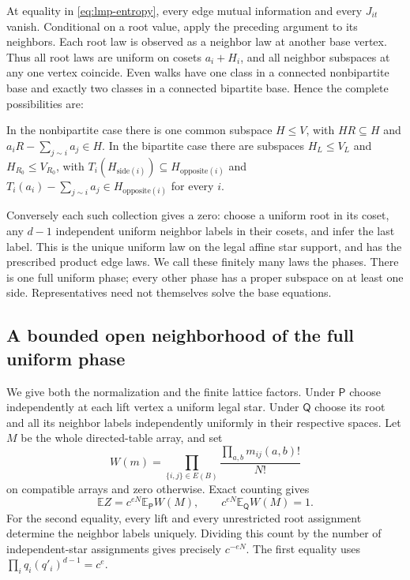 At equality in \eqref{eq:lmp-entropy}, every edge mutual information
and every $J_{it}$ vanish. Conditional on a root value, apply the
preceding argument to its neighbors. Each root law is observed as a
neighbor law at another base vertex. Thus all root laws are uniform
on cosets $a_i+H_i$, and all neighbor subspaces at any one vertex
coincide. Even walks have one class in a connected nonbipartite base
and exactly two classes in a connected bipartite base. Hence the
complete possibilities are:

In the nonbipartite case there is one common subspace $H\le V$, with
$HR\subseteq H$ and $a_iR-\sum_{j\sim i}a_j\in H$.
In the bipartite case there are subspaces $H_L\le V_L$ and
$H_{R_0}\le V_{R_0}$, with
$T_i(H_{\mathrm{side}(i)})\subseteq H_{\mathrm{opposite}(i)}$ and
$T_i(a_i)-\sum_{j\sim i}a_j\in H_{\mathrm{opposite}(i)}$ for every $i$.

Conversely each such collection gives a zero: choose a uniform root
in its coset, any $d-1$ independent uniform neighbor labels in their
cosets, and infer the last label. This is the unique uniform law on
the legal affine star support, and has the prescribed product edge
laws. We call these finitely many laws the phases. There is one full
uniform phase; every other phase has a proper subspace on at least
one side. Representatives need not themselves solve the base equations.

\subsection{A bounded open neighborhood of the full uniform phase}
We give both the normalization and the finite lattice factors. Under
$\mathsf P$ choose independently at each lift vertex a uniform legal
star. Under $\mathsf Q$ choose its root and all its neighbor labels
independently uniformly in their respective spaces. Let $M$ be the
whole directed-table array, and set
\[
 W(m)=\prod_{\{i,j\}\in E(B)}\frac{\prod_{a,b}m_{ij}(a,b)!}{N!}
\]
on compatible arrays and zero otherwise. Exact counting gives
\begin{equation}\label{eq:lmp-normalizer}
 \mathbb E Z=c^{eN}\mathbb E_{\mathsf P}W(M),\qquad
 c^{eN}\mathbb E_{\mathsf Q}W(M)=1.
\end{equation}
For the second equality, every lift and every unrestricted root
assignment determine the neighbor labels uniquely. Dividing this
count by the number of independent-star assignments gives precisely
$c^{-eN}$. The first equality uses
$\prod_i q_i(q'_i)^{d-1}=c^e$.

